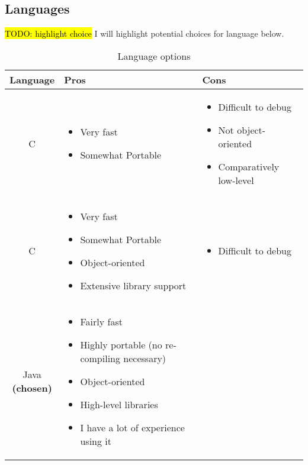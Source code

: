 \documentclass[12pt,a4paper,twoside,openright]{report}
\makeatletter
\newcommand{\CC}{C\nolinebreak\hspace{-.05em}\raisebox{.4ex}{\tiny\bf +}\nolinebreak\hspace{-.10em}\raisebox{.4ex}{\tiny\bf +}} %
\newcommand{\todo}[1]{\hl{TODO: #1}}
\newcommand{\specialcell}[2][c]{%
	\begin{tabular}[#1]{@{}c@{}}#2\end{tabular}} %
\makeatother
\begin{document}
	\subsection{Languages} \todo{highlight choice}
	I will highlight potential choices for language below.
	\begin{table}[H]
		\label{tab:languages}
		\centering
		
		\caption{Language options}
		\begin{tabularx}{\linewidth}{|c|X|X|}
			\hline 
			\textbf{Language} & \textbf{Pros} & \textbf{Cons} \\ 
			\hline 
			C & \begin{itemize}[leftmargin=5mm] \setlength\itemsep{-0.2em}
				\item Very fast
				\item Somewhat Portable
			\end{itemize} &
			\begin{itemize}[leftmargin=5mm] \setlength\itemsep{-0.2em}
				\item Difficult to debug
				\item Not object-oriented
				\item Comparatively low-level
			\end{itemize} \\ 
			\hline 
			\CC & \begin{itemize}[leftmargin=5mm] \setlength\itemsep{-0.2em}
				\item Very fast
				\item Somewhat Portable
				\item Object-oriented
				\item Extensive library support
			\end{itemize} &
			\begin{itemize}[leftmargin=5mm] \setlength\itemsep{-0.2em}
				\item Difficult to debug
			\end{itemize} \\ 
			\hline 
			\specialcell[t]{Java\\ \textbf{(chosen)}} & \begin{itemize}[leftmargin=5mm] \setlength\itemsep{-0.2em}
				\item Fairly fast
				\item Highly portable (no re-compiling necessary)
				\item Object-oriented
				\item High-level libraries
				\item I have a lot of experience using it

\end{itemize}
\end{tabularx}
\end{table}
\end{document}
